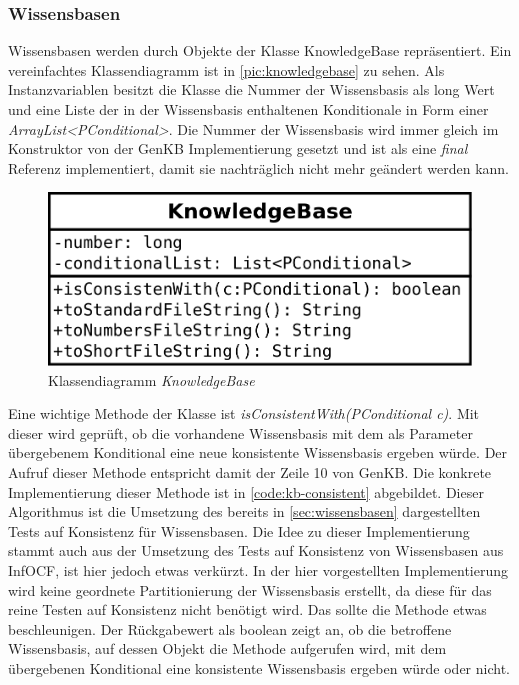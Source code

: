 \documentclass[12pt,a4paper]{article}
\begin{document}
\subsubsection{Wissensbasen}




Wissensbasen werden durch Objekte der Klasse KnowledgeBase repräsentiert. Ein vereinfachtes Klassendiagramm ist in \autoref{pic:knowledgebase} zu sehen. Als Instanzvariablen besitzt die Klasse die Nummer der Wissensbasis als long Wert und eine Liste der in der Wissensbasis enthaltenen Konditionale in Form einer \textit{ArrayList<PConditional>}. Die Nummer der Wissensbasis wird immer gleich im Konstruktor von der GenKB Implementierung gesetzt und ist als eine \textit{final} Referenz implementiert, damit sie nachträglich nicht mehr geändert werden kann.


\begin{figure}
\includegraphics[width=0.45\linewidth]{bilder/KnowledgeBase.png}
\caption{Klassendiagramm \textit{KnowledgeBase}}
\label{pic:knowledgebase}
\end{figure}




Eine wichtige Methode der Klasse ist \textit{isConsistentWith(PConditional c)}. Mit dieser wird geprüft, ob die vorhandene Wissensbasis mit dem als Parameter übergebenem Konditional eine neue konsistente Wissensbasis ergeben würde. Der Aufruf dieser Methode entspricht damit der Zeile 10 von GenKB. Die konkrete Implementierung dieser Methode ist in \autoref{code:kb-consistent} abgebildet. Dieser Algorithmus ist die Umsetzung des bereits in \autoref{sec:wissensbasen} dargestellten Tests auf Konsistenz für Wissensbasen.  Die Idee zu dieser Implementierung stammt auch aus der Umsetzung des Tests auf Konsistenz von Wissensbasen aus InfOCF, ist hier jedoch etwas verkürzt. In der hier vorgestellten Implementierung wird keine geordnete Partitionierung der Wissensbasis erstellt, da diese für das reine Testen auf Konsistenz nicht benötigt wird. Das sollte die Methode etwas beschleunigen. Der Rückgabewert als boolean zeigt an, ob die betroffene Wissensbasis, auf dessen Objekt die Methode aufgerufen wird, mit dem übergebenen Konditional eine konsistente Wissensbasis ergeben würde oder nicht. 
\end{document}
